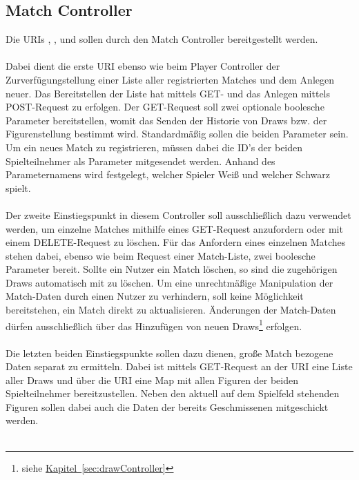 \subsection{Match Controller}\label{sec:matchController}
Die \glspl{URI} , ,  und  sollen durch den Match Controller bereitgestellt werden.\\
\\
Dabei dient die erste \gls{URI} ebenso wie beim Player Controller der Zurverfügungstellung einer Liste aller registrierten Matches und dem Anlegen neuer. Das Bereitstellen der Liste hat mittels GET- und das Anlegen mittels POST-Request zu erfolgen. Der GET-Request soll zwei optionale boolesche Parameter bereitstellen, womit das Senden der Historie von Draws bzw. der Figurenstellung bestimmt wird. Standardmäßig sollen die beiden Parameter  sein. Um ein neues Match zu registrieren, müssen dabei die ID's der beiden Spielteilnehmer als Parameter mitgesendet werden. Anhand des Parameternamens wird festgelegt, welcher Spieler Weiß und welcher Schwarz spielt.\\
\\
Der zweite Einstiegspunkt in diesem Controller soll ausschließlich dazu verwendet werden, um einzelne Matches mithilfe eines GET-Request anzufordern oder mit einem DELETE-Request zu löschen. Für das Anfordern eines einzelnen Matches stehen dabei, ebenso wie beim Request einer Match-Liste, zwei boolesche Parameter bereit. Sollte ein Nutzer ein Match löschen, so sind die zugehörigen Draws automatisch mit zu löschen. Um eine unrechtmäßige Manipulation der Match-Daten durch einen Nutzer zu verhindern, soll keine Möglichkeit bereitstehen, ein Match direkt zu aktualisieren. Änderungen der Match-Daten dürfen ausschließlich über das Hinzufügen von neuen Draws\footnote{siehe \hyperref[sec:drawController]{Kapitel~\ref{sec:drawController}}} erfolgen.\\
\\
Die letzten beiden Einstiegspunkte sollen dazu dienen, große Match bezogene Daten separat zu ermitteln. Dabei ist mittels GET-Request an der \gls{URI}  eine Liste aller Draws und über die \gls{URI}  eine Map mit allen Figuren der beiden Spielteilnehmer bereitzustellen. Neben den aktuell auf dem Spielfeld stehenden Figuren sollen dabei auch die Daten der bereits Geschmissenen mitgeschickt werden.\\
\\
